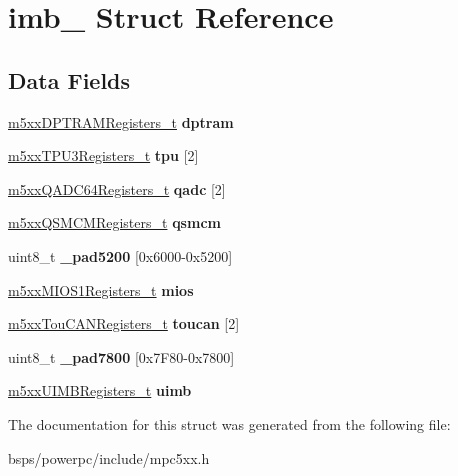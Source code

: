 \hypertarget{structimb__}{}\section{imb\+\_\+ Struct Reference}
\label{structimb__}
\subsection*{Data Fields}
\begin{DoxyCompactItemize}
\item 
\mbox{\label{structimb___a92669f59690effbba599950247fbed5b}} 
\mbox{\hyperlink{structm5xxDPTRAMRegisters__}{m5xx\+D\+P\+T\+R\+A\+M\+Registers\+\_\+t}} {\bfseries dptram}
\item 
\mbox{\label{structimb___a711d6cf41c7aad871becf1cf640d6afc}} 
\mbox{\hyperlink{structm5xxTPU3Registers__}{m5xx\+T\+P\+U3\+Registers\+\_\+t}} {\bfseries tpu} \mbox{[}2\mbox{]}
\item 
\mbox{\label{structimb___a20c9b4fedf22dbf7c9d55dc0950cc19c}} 
\mbox{\hyperlink{structm5xxQADC64Registers__}{m5xx\+Q\+A\+D\+C64\+Registers\+\_\+t}} {\bfseries qadc} \mbox{[}2\mbox{]}
\item 
\mbox{\label{structimb___ab1b12e395def0162321c91ac503a4cfb}} 
\mbox{\hyperlink{structm5xxQSMCMRegisters__}{m5xx\+Q\+S\+M\+C\+M\+Registers\+\_\+t}} {\bfseries qsmcm}
\item 
\mbox{\label{structimb___a0dd8bf4e9fc60189a4e0f04d4ebcaf31}} 
uint8\+\_\+t {\bfseries \+\_\+pad5200} \mbox{[}0x6000-\/0x5200\mbox{]}
\item 
\mbox{\label{structimb___a446d463e06f52b928f38817bb0481e69}} 
\mbox{\hyperlink{structm5xxMIOS1Registers__}{m5xx\+M\+I\+O\+S1\+Registers\+\_\+t}} {\bfseries mios}
\item 
\mbox{\label{structimb___a0f743db7a8e198e6a53f6d144168e4e3}} 
\mbox{\hyperlink{structm5xxTouCANRegisters__}{m5xx\+Tou\+C\+A\+N\+Registers\+\_\+t}} {\bfseries toucan} \mbox{[}2\mbox{]}
\item 
\mbox{\label{structimb___a366a5e31881c270c2c5b3b2125b9c87a}} 
uint8\+\_\+t {\bfseries \+\_\+pad7800} \mbox{[}0x7\+F80-\/0x7800\mbox{]}
\item 
\mbox{\label{structimb___a58b800ba82ecf18c1619fdec79b315d4}} 
\mbox{\hyperlink{structm5xxUIMBRegisters__}{m5xx\+U\+I\+M\+B\+Registers\+\_\+t}} {\bfseries uimb}
\end{DoxyCompactItemize}


The documentation for this struct was generated from the following file\+:\begin{DoxyCompactItemize}
\item 
bsps/powerpc/include/mpc5xx.\+h\end{DoxyCompactItemize}
